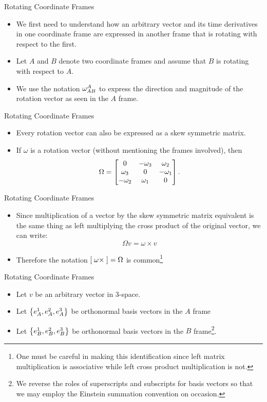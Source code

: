 \begin{frame}
Rotating Coordinate Frames
\begin{itemize}
\item We first need to understand how an arbitrary vector and its time
derivatives in one coordinate frame are expressed in another frame
that is rotating with respect to the first.  
\item Let $A$ and $B$
denote two coordinate frames and assume that $B$ is rotating with
respect to $A$.  
\item We use the notation $\rotvec{A}{B}^A$ to express
the direction and magnitude of the rotation vector as seen in the $A$ frame.
\end{itemize}
\end{frame}
\begin{frame}
Rotating Coordinate Frames
\begin{itemize}
\item Every rotation vector can also be expressed as a skew symmetric
matrix.  
\item If $\omega$ is a rotation vector (without mentioning the
frames involved), then
\[\Omega = \skewsymmat{\omega}{1}{2}{3}.\]
\end{itemize}
\end{frame}
\begin{frame}
Rotating Coordinate Frames
\begin{itemize}
\item Since multiplication of a vector by the skew symmetric matrix
equivalent is the same thing as left multiplying the cross product
of the original vector, we can write:
\[\Omega v = \omega \times v\]
\item Therefore the notation $\xop{\omega}=\Omega$ is
common\footnote{One must be careful in making this identification
since left matrix multiplication is associative while left cross
product multiplication is not.}
\end{itemize}
\end{frame}

\begin{frame}
Rotating Coordinate Frames
\begin{itemize}
\item Let $v$ be an arbitrary vector in 3-space. 
\item Let
$\set{e_A^1,e_A^2,e_A^3}$ be orthonormal basis vectors in the $A$
frame 
\item Let $\set{e_B^1,e_B^2,e_B^3}$ be orthonormal basis
vectors in the $B$ frame\footnote{We reverse the roles of superscripts
and subscripts for basis vectors so that we may employ the
Einstein summation convention on occasion.}.  
\end{itemize}
\end{frame}

